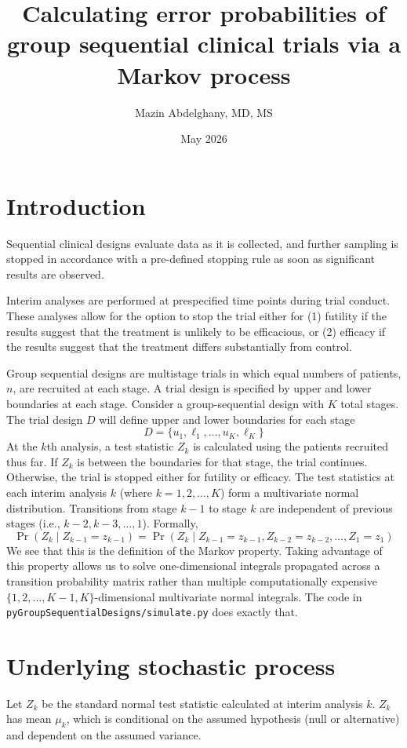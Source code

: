 \documentclass{article}
\title{\textbf{Calculating error probabilities of group sequential clinical trials via a Markov process}}
\author{Mazin Abdelghany, MD, MS}
\date{May 2026}
\begin{document}
\maketitle
%
\section{Introduction}
%
Sequential clinical designs evaluate data as it is collected, and further sampling is stopped in accordance with a pre-defined stopping rule as soon as significant results are observed.

Interim analyses are performed at prespecified time points during trial conduct. These analyses allow for the option to stop the trial either for (1) futility if the results suggest that the treatment is unlikely to be efficacious, or (2) efficacy if the results suggest that the treatment differs substantially from control. 

Group sequential designs are multistage trials in which equal numbers of patients, $n$, are recruited at each stage. A trial design is specified by upper and lower boundaries at each stage. Consider a group-sequential design with $K$ total stages. The trial design $D$ will define upper and lower boundaries for each stage
%
\begin{equation}
    D = \{u_1, \ell_1, \dots,u_K,\ell_K\}
\end{equation}
%
At the $k$th analysis, a test statistic $Z_k$ is calculated using the patients recruited thus far. If $Z_k$ is between the boundaries for that stage, the trial continues. Otherwise, the trial is stopped either for futility or efficacy. The test statistics at each interim analysis $k$ (where $k = 1, 2,\dots, K$) form a multivariate normal distribution. Transitions from stage $k-1$ to stage $k$ are independent of previous stages (i.e., $k-2,k-3,\dots,1$). Formally,
%
\begin{equation}
    \Pr(Z_{k}\mid Z_{k-1} = z_{k-1}) = \Pr(Z_k \mid Z_{k-1} = z_{k-1}, Z_{k-2} = z_{k-2}, \dots, Z_1=z_1)
\end{equation}
%
We see that this is the definition of the Markov property. Taking advantage of this property allows us to solve one-dimensional integrals propagated across a transition probability matrix rather than multiple computationally expensive $\{1, 2, \dots, K-1, K\}$-dimensional multivariate normal integrals. The code in \texttt{pyGroupSequentialDesigns/simulate.py} does exactly that.
%
\section{Underlying stochastic process}
%
Let $Z_k$ be the standard normal test statistic calculated at interim analysis $k$. $Z_k$ has mean $\mu_k$, which is conditional on the assumed hypothesis (null or alternative) and dependent on the assumed variance.
\end{document}
